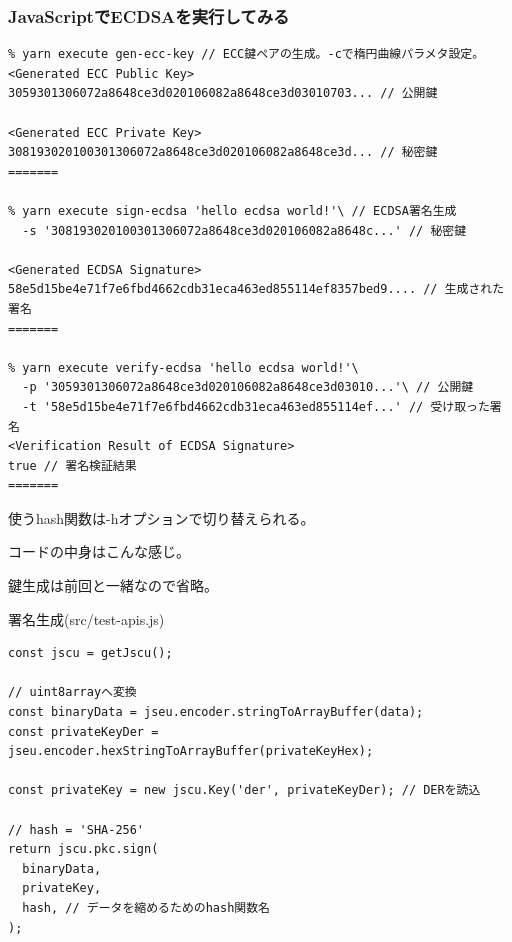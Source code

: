 \documentclass[12pt,dvipdfmx]{beamer}
\begin{document}
\begin{frame}[fragile]
\frametitle{JavaScriptでECDSAを実行してみる}
\begin{exampleblock}{}
\scriptsize
\begin{verbatim}
% yarn execute gen-ecc-key // ECC鍵ペアの生成。-cで楕円曲線パラメタ設定。
<Generated ECC Public Key>
3059301306072a8648ce3d020106082a8648ce3d03010703... // 公開鍵

<Generated ECC Private Key>
308193020100301306072a8648ce3d020106082a8648ce3d... // 秘密鍵
=======

% yarn execute sign-ecdsa 'hello ecdsa world!'\ // ECDSA署名生成
  -s '308193020100301306072a8648ce3d020106082a8648c...' // 秘密鍵

<Generated ECDSA Signature>
58e5d15be4e71f7e6fbd4662cdb31eca463ed855114ef8357bed9.... // 生成された署名
=======

% yarn execute verify-ecdsa 'hello ecdsa world!'\
  -p '3059301306072a8648ce3d020106082a8648ce3d03010...'\ // 公開鍵
  -t '58e5d15be4e71f7e6fbd4662cdb31eca463ed855114ef...' // 受け取った署名
<Verification Result of ECDSA Signature>
true // 署名検証結果
=======
\end{verbatim}
\end{exampleblock}
使うhash関数は-hオプションで切り替えられる。
\end{frame}

\begin{frame}[fragile]
コードの中身はこんな感じ。

鍵生成は前回と一緒なので省略。

\begin{block}{\small 署名生成(src/test-apis.js)}
\scriptsize
\begin{verbatim}
const jscu = getJscu();

// uint8arrayへ変換
const binaryData = jseu.encoder.stringToArrayBuffer(data);
const privateKeyDer = jseu.encoder.hexStringToArrayBuffer(privateKeyHex);

const privateKey = new jscu.Key('der', privateKeyDer); // DERを読込

// hash = 'SHA-256'
return jscu.pkc.sign(
  binaryData,
  privateKey,
  hash, // データを縮めるためのhash関数名
);
\end{verbatim}
\end{block}
\end{frame}
\end{document}
